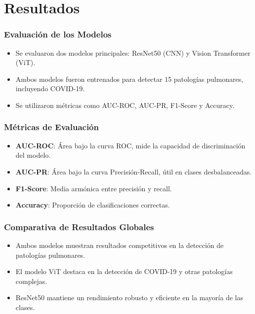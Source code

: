 
\section{Resultados}

\begin{frame}
\frametitle{Evaluación de los Modelos}
\begin{itemize}
    \item Se evaluaron dos modelos principales: ResNet50 (CNN) y Vision Transformer (ViT).
    \item Ambos modelos fueron entrenados para detectar 15 patologías pulmonares, incluyendo COVID-19.
    \item Se utilizaron métricas como AUC-ROC, AUC-PR, F1-Score y Accuracy.
\end{itemize}
\end{frame}

\begin{frame}
\frametitle{Métricas de Evaluación}
\begin{itemize}
    \item \textbf{AUC-ROC}: Área bajo la curva ROC, mide la capacidad de discriminación del modelo.
    \item \textbf{AUC-PR}: Área bajo la curva Precisión-Recall, útil en clases desbalanceadas.
    \item \textbf{F1-Score}: Media armónica entre precisión y recall.
    \item \textbf{Accuracy}: Proporción de clasificaciones correctas.
\end{itemize}
\end{frame}

\begin{frame}
\frametitle{Comparativa de Resultados Globales}
\begin{itemize}
    \item Ambos modelos muestran resultados competitivos en la detección de patologías pulmonares.
    \item El modelo ViT destaca en la detección de COVID-19 y otras patologías complejas.
    \item ResNet50 mantiene un rendimiento robusto y eficiente en la mayoría de las clases.
\end{itemize}
\end{frame}

